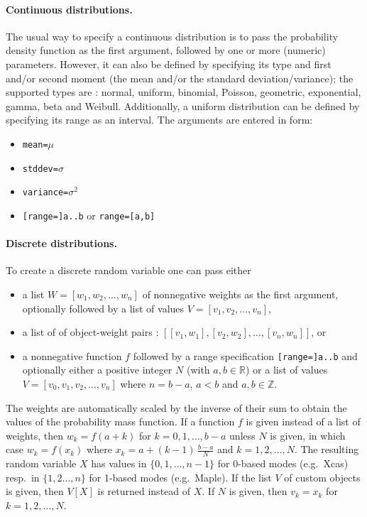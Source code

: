 \documentclass[a4paper,11pt]{book}
\begin{document}
\paragraph{Continuous distributions.} The usual way to specify a continuous distribution is to pass the probability density function as the first argument, followed by one or more (numeric) parameters. However, it can also be defined by specifying its type and first and/or second moment (the mean and/or the standard deviation/variance); the supported types are : normal, uniform, binomial, Poisson, geometric, exponential, gamma, beta and Weibull. Additionally, a uniform distribution can be defined by specifying its range as an interval. The arguments are entered in form:
\begin{itemize}
  \item {\tt mean=}$\mu$
  \item {\tt stddev=}$\sigma$
  \item {\tt variance=}$\sigma^2$
  \item {\tt [range=]a..b} or {\tt range=[a,b]}
\end{itemize}

\paragraph{Discrete distributions.} To create a discrete random variable one can pass either
\begin{itemize}
  \item a list $W=[w_1,w_2,\dots,w_n]$ of nonnegative weights as the first argument, optionally followed by a list of values $V=[v_1,v_2,\dots,v_n]$,
  \item a list of of object-weight pairs : $[[v_1,w_1],[v_2,w_2],\dots,[v_n,w_n]]$, or
  \item a nonnegative function $f$ followed by a range specification {\tt [range=]a..b} and optionally either a positive integer $N$ (with $a,b\in\mathbb{R}$) or a list of values $V=[v_0,v_1,v_2,\dots,v_n]$ where $n=b-a$, $a<b$ and $a,b\in\mathbb{Z}$.
\end{itemize}
The weights are automatically scaled by the inverse of their sum to obtain the values of the probability mass function. If a function $f$ is given instead of a list of weights, then $w_k=f(a+k)$ for $k=0,1,\dots,b-a$ unless $N$ is given, in which case $w_k=f(x_k)$ where $x_k=a+(k-1)\,\frac{b-a}{N}$ and $k=1,2,\dots,N$. The resulting random variable $X$ has values in $\{0,1,\dots,n-1\}$ for 0-based modes (e.g.~Xcas) resp.~in $\{1,2\dots,n\}$ for 1-based modes (e.g.~Maple). If the list $V$ of custom objects is given, then $V[X]$ is returned instead of $X$. If $N$ is given, then $v_k=x_k$ for $k=1,2,\dots,N$.
\end{document}
